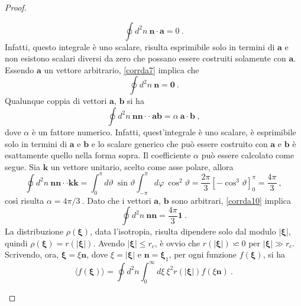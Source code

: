 \documentclass[12pt,a4paper]{report}
\numberwithin{equation}{section}
\numberwithin{section}{chapter}
\begin{document}
\begin{proof}
\begin{enumerate} [leftmargin=0pt, itemindent=2.67\parindent]
\begin{equation}
		\oint d^2n~\boldsymbol{n} \cdot \boldsymbol{a} = 0~.
		\end{equation}
		Infatti, questo integrale \`e uno scalare, risulta esprimibile solo in termini di $\boldsymbol{a}$ e non esistono scalari diversi da zero che possano essere costruiti solamente con $\boldsymbol{a}$. Essendo $\boldsymbol{a}$ un vettore arbitrario, \eqref{corrda7} implica che
		\begin{equation}
		\label{corrda8}
		\oint d^2n~\boldsymbol{n} = \boldsymbol{0}~.
		\end{equation}
		Qualunque coppia di vettori $\boldsymbol{a}$, $\boldsymbol{b}$ si ha
		\begin{equation}
		\label{corrda9}
		\oint d^2n~\boldsymbol{n}\boldsymbol{n} \cdot \cdot~\boldsymbol{ab} = \alpha~\boldsymbol{a} \cdot \boldsymbol{b}~,
		\end{equation}
		dove $\alpha$ \`e un fattore numerico.  Infatti, quest'integrale \`e uno scalare, \`e esprimibile solo in termini di $\boldsymbol{a}$ e $\boldsymbol{b}$ e lo scalare generico che pu\`o essere costruito con $\boldsymbol{a}$ e $\boldsymbol{b}$ \`e esattamente quello nella forma sopra. Il coefficiente $\alpha$ pu\`o essere calcolato come segue. Sia $\boldsymbol{k}$ un vettore unitario, scelto come asse polare, allora
		\begin{equation}
		\label{corrda10}
		\oint d^2n~\boldsymbol{nn} \cdot \cdot \boldsymbol{kk} = \int_{0}^{\pi} d\vartheta~\sin\vartheta\int_{-\pi}^{\pi} d\varphi~\cos^2\vartheta = \frac{2\pi}{3}[-\cos^3\vartheta]_0^{\pi} = \frac{4\pi}{3}~,
		\end{equation}
		cos\`i risulta $\alpha = 4\pi/3~$. Dato che i vettori $\boldsymbol{a}$, $\boldsymbol{b}$ sono arbitrari, \eqref{corrda10} implica
		\begin{equation}
		\label{corrda11}
		\oint d^2n~\boldsymbol{nn} = \frac{4\pi}{3}\boldsymbol{1}~.
		\end{equation}
		La distribuzione $\rho(\boldsymbol{\xi})$, data l'isotropia, risulta dipendere solo dal modulo $|\boldsymbol{\xi}|$, quindi $\rho(\boldsymbol{\xi}) = r(|\boldsymbol{\xi}|)$. Avendo $|\boldsymbol{\xi}| \leq r_c$, \`e ovvio che $r(|\boldsymbol{\xi}|) \backsimeq 0$ per $|\boldsymbol{\xi}| \gg r_c$. Scrivendo, ora, $\boldsymbol{\xi} = \xi\boldsymbol{n}$, dove $\xi = |\boldsymbol{\xi}|$ e $\boldsymbol{n} = \boldsymbol{\xi}_1$, per ogni funzione $f(\boldsymbol{\xi})$, si ha
		\begin{equation}
		\label{corrda12}
		\langle f(\boldsymbol{\xi})\rangle = \oint d^2n \int_{0}^{\infty}d\xi~\xi^2r(|\boldsymbol{\xi}|)f(\xi\boldsymbol{n})~.

\end{equation}
\end{enumerate}
\end{proof}
\end{document}
